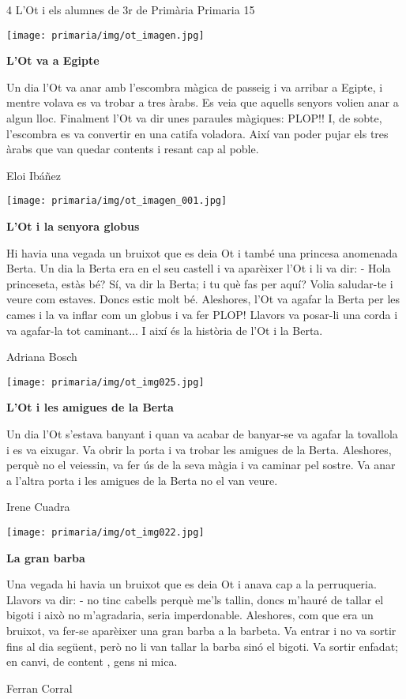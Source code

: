 \begin{news}
{4} %
{L’Ot i els alumnes de 3r de Primària}
{}
{Primaria}
{15} %


\noindent\texttt{[image: primaria/img/ot\_imagen.jpg]}

\bf L’Ot va a Egipte

\rm
Un dia l’Ot va anar amb l’escombra màgica de passeig i va arribar a Egipte, i mentre volava es va trobar a tres àrabs. Es veia que aquells senyors volien anar a  algun lloc. Finalment l’Ot va dir unes paraules màgiques: PLOP!! I, de sobte, l’escombra es va convertir en una catifa voladora. Així van poder pujar els tres àrabs que van quedar contents i resant cap al poble.

                                      Eloi Ibáñez           


\noindent\texttt{[image: primaria/img/ot\_imagen\_001.jpg]}

\bf L’Ot i la senyora globus

\rm
Hi havia una vegada un bruixot que es deia Ot i també una princesa anomenada Berta. Un dia la Berta era en el seu castell i va aparèixer l’Ot i li va dir: 
-   Hola princeseta, estàs bé? 
Sí, va dir la Berta; i tu què fas per aquí?
Volia saludar-te i  veure com estaves.
Doncs estic molt bé.
Aleshores, l’Ot va agafar la Berta per les cames i la va inflar com un globus i va fer PLOP! Llavors va posar-li una corda i va agafar-la tot caminant... I així és la història de l’Ot i la Berta.
     
                                                           Adriana Bosch


\noindent\texttt{[image: primaria/img/ot\_img025.jpg]}

\bf L’Ot i les amigues de la Berta

\rm
Un dia l’Ot s’estava banyant i quan va acabar de banyar-se va agafar la tovallola i es va eixugar. Va obrir la porta i va trobar les amigues de la Berta. Aleshores, perquè no el veiessin, va fer ús de la seva màgia i va caminar pel sostre. Va anar a l’altra porta i les amigues de la Berta no el van veure.

                                                                Irene Cuadra

\noindent\texttt{[image: primaria/img/ot\_img022.jpg]}

\bf La gran barba

\rm

Una vegada hi havia un bruixot que es deia Ot i anava cap a la perruqueria. Llavors va dir: - no tinc cabells perquè me’ls tallin, doncs m’hauré de tallar el bigoti i això no m’agradaria, seria imperdonable. Aleshores, com que era un bruixot, va fer-se aparèixer una gran barba a la barbeta. Va entrar i no va sortir fins al dia següent, però no li van tallar la barba sinó el bigoti. Va sortir enfadat; en canvi,  de content , gens ni mica.

                                                             Ferran Corral 


\end{news}

